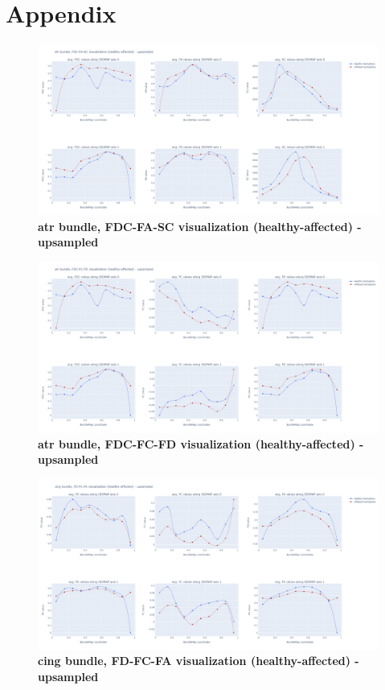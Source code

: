 \documentclass[thesis.tex]{subfiles}
\begin{document}
\chapter{Appendix}

\begin{figure}
  \centering
  \includegraphics[width=24cm]{thesis_radomskyi/apendix/atr bundle, FDC-FA-SC visualization (healthy-affected) - upsampled.png}
    \caption{\textbf{atr bundle, FDC-FA-SC visualization (healthy-affected) - upsampled}}
\end{figure}

\begin{figure}
  \centering
  \includegraphics[width=24cm]{thesis_radomskyi/apendix/atr bundle, FDC-FC-FD visualization (healthy-affected) - upsampled.png}
    \caption{\textbf{atr bundle, FDC-FC-FD visualization (healthy-affected) - upsampled}}
\end{figure}

\begin{figure}
  \centering
  \includegraphics[width=24cm]{thesis_radomskyi/apendix/cing bundle, FD-FC-FA visualization (healthy-affected) - upsampled.png}
    \caption{\textbf{cing bundle, FD-FC-FA visualization (healthy-affected) - upsampled}}
\end{figure}
\end{document}
